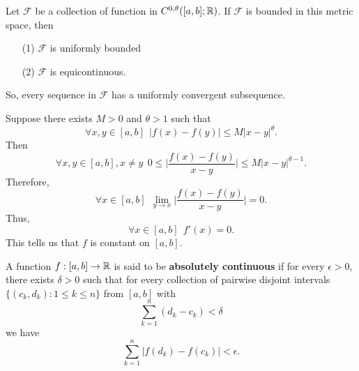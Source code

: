 
\begin{remark}
    Let \( \mathcal{F} \) be a collection of function in \( C^{0,\theta}([a,b]; \mathbb{R}) \). If \( \mathcal{F} \) is bounded in this metric space, then 
    \begin{enumerate}
        \item[(1)] \( \mathcal{F} \) is uniformly bounded
        \item[(2)] \( \mathcal{F} \) is equicontinuous.
    \end{enumerate}
    So, every sequence in \( \mathcal{F} \) has a uniformly convergent subsequence.
\end{remark}

\begin{remark}
    Suppose there exists \( M > 0  \) and \( \theta > 1  \) such that 
    \[  \forall x,y \in [a,b] \ \ | f(x) - f(y) |  \leq M | x- y  |^{\theta}.  \]
    Then 
    \[  \forall x,y \in [a,b], x \neq y \ \ 0 \leq \Big| \frac{ f(x) - f(y) }{ x - y  }  \Big|  \leq M |  x -y  |^{\theta - 1}.  \]
    Therefore, 
    \[  \forall x \in [a,b] \ \ \lim_{ y \to x }  \Big| \frac{ f(x) - f(y) }{ x - y  }  \Big|  = 0.   \]
    Thus, 
    \[  \forall x \in [a,b] \ \ f'(x ) = 0.  \]
    This tells us that \( f  \) is constant on \( [a,b] \).
\end{remark}

\begin{definition}
    A function \( f:[a,b] \to \mathbb{R}  \) is said to be \textbf{absolutely continuous} if for every \( \epsilon > 0  \), there exists \( \delta > 0  \) such that for every collection of pairwise disjoint intervals \( \{ ({c}_{k }, {d}_{k}) : 1 \leq k \leq n  \}  \) from \( [a,b] \) with 
    \[  \sum_{ k=1  }^{ n } ({d}_{k} - {c}_{k}) < \delta \]
    we have 
    \[  \sum_{ k=1  }^{ n } | f({d}_{k}) - f({c}_{k}) |  < \epsilon. \]
\end{definition}

